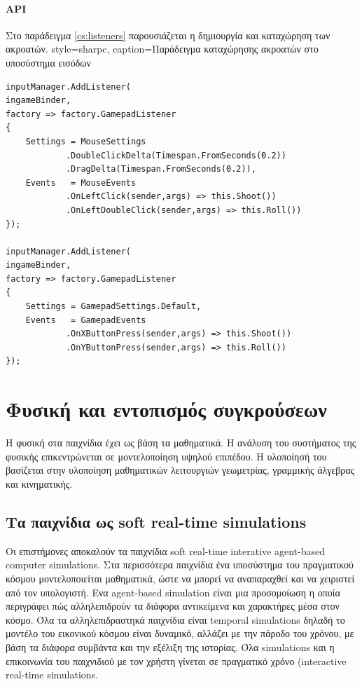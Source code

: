 	\newpage
	\paragraph{API}
	Στο παράδειγμα \ref{cs:listeners} παρουσιάζεται η δημιουργία και καταχώρηση των ακροατών. 
	\lstset
	{		
		style=sharpc, 
		caption={Παράδειγμα καταχώρησης ακροατών στο υποσύστημα εισόδων}
	}
	\label{cs:listeners}
	\begin{lstlisting}
inputManager.AddListener(
ingameBinder,
factory => factory.GamepadListener
{
	Settings = MouseSettings
		    .DoubleClickDelta(Timespan.FromSeconds(0.2))
			.DragDelta(Timespan.FromSeconds(0.2)),
	Events   = MouseEvents
	        .OnLeftClick(sender,args) => this.Shoot())
	        .OnLeftDoubleClick(sender,args) => this.Roll())      	
});

inputManager.AddListener(
ingameBinder,
factory => factory.GamepadListener
{
	Settings = GamepadSettings.Default,
	Events   = GamepadEvents
			.OnXButtonPress(sender,args) => this.Shoot())
			.OnYButtonPress(sender,args) => this.Roll())      	
});
\end{lstlisting}

\section{Φυσική και εντοπισμός συγκρούσεων}
Η φυσική στα παιχνίδια έχει ως βάση τα μαθηματικά. Η ανάλυση του συστήματος της φυσικής επικεντρώνεται σε μοντελοποίηση υψηλού επιπέδου. Η υλοποίησή του βασίζεται στην υλοποίηση μαθηματικών λειτουργιών γεωμετρίας, γραμμικής άλγεβρας και κινηματικής.

\subsection{Τα παιχνίδια ως soft real-time simulations}
Οι επιστήμονες αποκαλούν τα παιχνίδια soft real-time interative agent-based computer simulations.
Στα περισσότερα παιχνίδια ένα υποσύστημα του πραγματικού κόσμου μοντελοποιείται μαθηματικά, ώστε να μπορεί να αναπαραχθεί και να χειριστεί από τον υπολογιστή. 
Ενα agent-based simulation είναι μια προσομοίωση η οποία περιγράφει πώς αλληλεπιδρούν τα διάφορα αντικείμενα και χαρακτήρες μέσα στον κόσμο.
Όλα τα αλληλεπιδραστηκά παιχνίδια είναι temporal simulations δηλαδή το μοντέλο του εικονικού κόσμου είναι δυναμικό, αλλάζει με την πάροδο του χρόνου, με βάση τα διάφορα συμβάντα και την εξέλιξη της ιστορίας.
Όλα simulations και η επικοινωνία του παιχνιδιού με τον χρήστη γίνεται σε πραγματικό χρόνο (interactive real-time simulations. 

